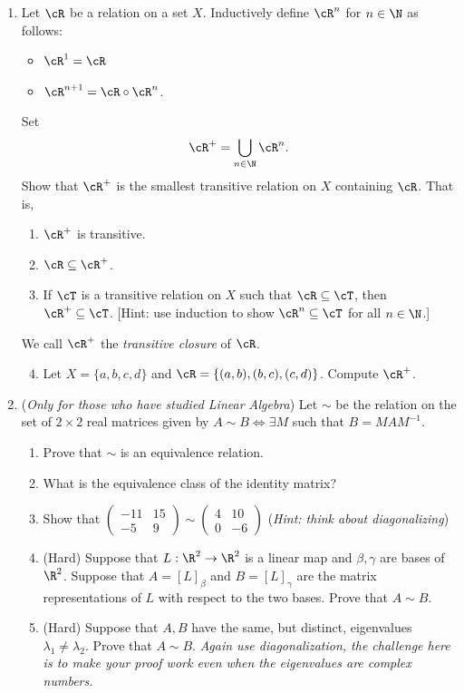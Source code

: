 \begin{enumerate}
	\item Let $\cR$ be a relation on a set $X$. Inductively define $\cR^n$ for $n \in \N$ as follows:
\begin{itemize}
    \item $\cR^1 = \cR$
    \item $\cR^{n + 1} = \cR \circ \cR^n$.
\end{itemize}
Set
\[
\cR^+ = \bigcup_{n \in \N} \cR^n.
\]
Show that $\cR^+$ is the smallest transitive relation on $X$ containing $\cR$. That is,
\begin{enumerate}
    \item $\cR^+$ is transitive.
    \item $\cR \subseteq \cR^+$.
    \item If $\cT$ is a transitive relation on $X$ such that $\cR \subseteq \cT$, then $\cR^+ \subseteq \cT$. [Hint: use induction to show $\cR^n \subseteq \cT$ for all $n \in \N$.]
\end{enumerate}
We call $\cR^+$ the \emph{transitive closure} of $\cR$.
\begin{enumerate}\setcounter{enumii}{3}
    \item Let $X = \{a,b,c,d\}$ and $\cR = \{(a,b), (b,c), (c,d)\}$. Compute $\cR^+$.
\end{enumerate}

  \item (\emph{Only for those who have studied Linear Algebra}) Let $\sim$ be the relation on the set of $2\times 2$ real matrices given by $A\sim B\iff\exists M$ such that $B=MAM^{-1}$.
  \begin{enumerate}
    \item Prove that $\sim$ is an equivalence relation.
    \item What is the equivalence class of the identity matrix?
    \item Show that $\left(\begin{smallmatrix}
    -11&15\\-5&9
    \end{smallmatrix}\right)\sim \left(\begin{smallmatrix}
    4&10\\0&-6
    \end{smallmatrix}\right)$ (\emph{Hint: think about diagonalizing})
    \item (Hard) Suppose that $L:\R^2\to\R^2$ is a linear map and $\beta,\gamma$ are bases of $\R^2$. Suppose that $A=[L]_\beta$ and $B=[L]_\gamma$ are the matrix representations of $L$ with respect to the two bases. Prove that $A\sim B$.
    \item (Hard) Suppose that $A,B$ have the same, but distinct, eigenvalues $\lambda_1\neq\lambda_2$. Prove that $A\sim B$. \emph{Again use diagonalization, the challenge here is to make your proof work even when the eigenvalues are complex numbers.}
	\end{enumerate}
\end{enumerate}
\newpage


